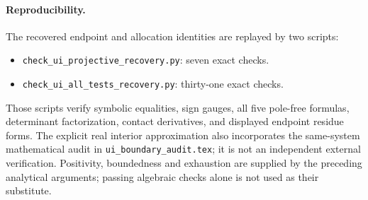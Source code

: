 \paragraph{Reproducibility.}
The recovered endpoint and allocation identities are replayed by
two scripts:
\begin{itemize}
\item \texttt{check\_ui\_projective\_recovery.py}: seven exact checks.
\item \texttt{check\_ui\_all\_tests\_recovery.py}: thirty-one exact checks.
\end{itemize}
Those scripts verify symbolic equalities, sign gauges, all five
pole-free formulas, determinant factorization, contact derivatives,
and displayed endpoint residue forms. The explicit real interior
approximation also incorporates the same-system mathematical audit
in \texttt{ui\_boundary\_audit.tex}; it is not an independent
external verification. Positivity, boundedness and
exhaustion are supplied by the preceding analytical arguments;
passing algebraic checks alone is not used as their substitute.
